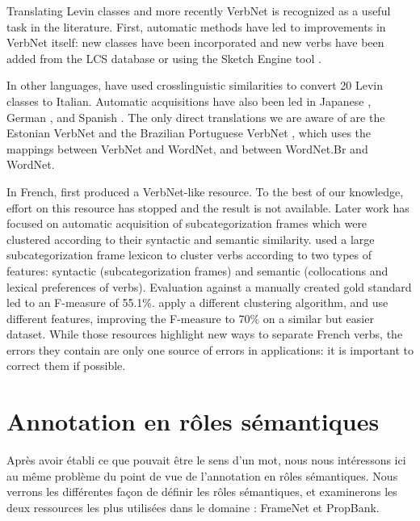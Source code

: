 Translating Levin classes and more recently VerbNet is recognized as a useful
task in the literature. First, automatic methods have led to improvements in
VerbNet itself: new classes have been incorporated
\citep{korhonen2004extended} and new verbs have been added from the LCS
database \citep{dorr2001lcs} or using the Sketch Engine tool
\citep{bonial2013expanding}.

In other languages, \cite{merlo2002multilingual} have used crosslinguistic
similarities to convert 20 Levin classes to Italian. Automatic acquisitions
have also been led in Japanese \citep{suzuki2009classifying}, German
\citep{im2006experiments}, and Spanish \citep{ferrer2004towards}. The
only direct translations we are aware of are the Estonian VerbNet
\citep{jentson2014verbnet} and the Brazilian Portuguese VerbNet
\citep{scarton2012towards}, which uses the mappings between VerbNet and
WordNet, and between WordNet.Br and WordNet.

In French, \cite{saintdizier1996constructing} first produced a VerbNet-like
resource. To the best of our knowledge, effort on this resource has stopped and
the result is not available. Later work has focused on automatic acquisition of
subcategorization frames which were clustered according to their syntactic and
semantic similarity. \cite{sun2010investigating} used a large
subcategorization frame lexicon \citep{messiant2010acquisition} to cluster
verbs according to two types of features: syntactic (subcategorization frames)
and semantic (collocations and lexical preferences of verbs). Evaluation
against a manually created gold standard led to an F-measure of 55.1\%.
\cite{falk2012classifying} apply a different clustering algorithm, and use
different features, improving the F-measure to 70\% on a similar but easier
dataset. While those resources highlight new ways to separate French verbs, the
errors they contain are only one source of errors in applications: it is
important to correct them if possible.


\section{Annotation en rôles sémantiques}
\label{senssituation}

Après avoir établi ce que pouvait être le sens d'un mot, nous nous intéressons
ici au même problème du point de vue de l'annotation en rôles sémantiques. Nous
verrons les différentes façon de définir les rôles sémantiques, et examinerons
les deux ressources les plus utilisées dans le domaine : FrameNet et PropBank.

